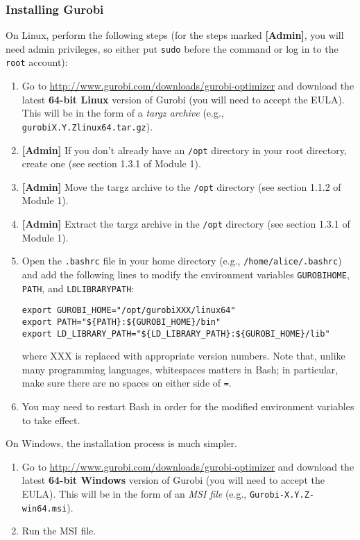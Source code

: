\documentclass[12pt]{article}
\begin{document}
\subsubsection{Installing Gurobi}
On Linux, perform the following steps (for the steps marked \textbf{[Admin]}, you will need admin privileges, so either put \texttt{sudo} before the command or log in to the \texttt{root} account):
\begin{enumerate}
    \item Go to \url{http://www.gurobi.com/downloads/gurobi-optimizer} and download the latest \textbf{64-bit Linux} version of Gurobi (you will need to accept the EULA).
        This will be in the form of a \emph{targz archive} (e.g., \texttt{gurobiX.Y.Z\ttul linux64.tar.gz}).
    \item \textbf{[Admin]} If you don't already have an \texttt{/opt} directory in your root directory, create one  (see section 1.3.1 of Module 1).
    \item \textbf{[Admin]} Move the targz archive to the \texttt{/opt} directory (see section 1.1.2 of Module 1). %
    \item \textbf{[Admin]} Extract the targz archive in the \texttt{/opt} directory (see section 1.3.1 of Module 1).
    \item Open the \texttt{.bashrc} file in your home directory (e.g., \texttt{/home/alice/.bashrc}) and add the following lines to modify the environment variables \texttt{GUROBI\ttul HOME}, \texttt{PATH}, and \texttt{LD\ttul LIBRARY\ttul PATH}:
\begin{verbatim}
export GUROBI_HOME="/opt/gurobiXXX/linux64"
export PATH="${PATH}:${GUROBI_HOME}/bin"
export LD_LIBRARY_PATH="${LD_LIBRARY_PATH}:${GUROBI_HOME}/lib"
\end{verbatim}
        where XXX is replaced with appropriate version numbers.
        Note that, unlike many programming languages, whitespaces matters in Bash; in particular, make sure there are no spaces on either side of \texttt{=}.
    \item You may need to restart Bash in order for the modified environment variables to take effect.
\end{enumerate}
On Windows, the installation process is much simpler.
\begin{enumerate}
    \item Go to \url{http://www.gurobi.com/downloads/gurobi-optimizer} and download the latest \textbf{64-bit Windows} version of Gurobi (you will need to accept the EULA).
        This will be in the form of an \emph{MSI file} (e.g., \texttt{Gurobi-X.Y.Z-win64.msi}).
    \item Run the MSI file.
\end{enumerate}
\end{document}
